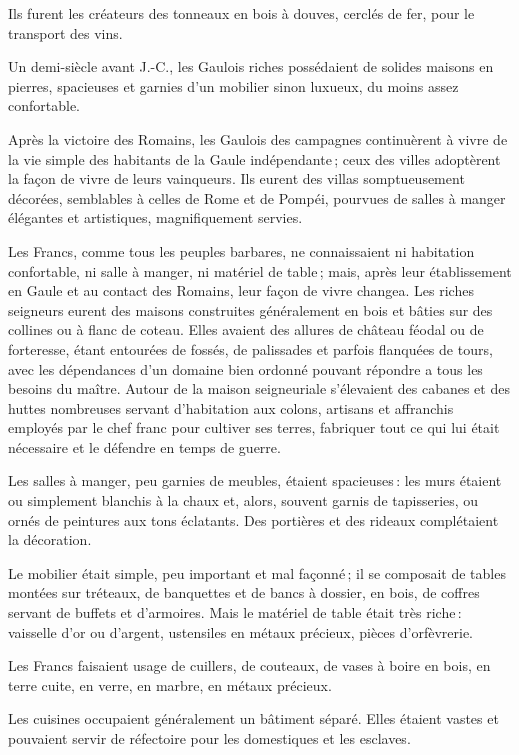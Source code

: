 Ils furent les créateurs des tonneaux en bois à douves, cerclés de fer, pour le
transport des vins.

Un demi-siècle avant J.-C., les Gaulois riches possédaient de solides maisons
en pierres, spacieuses et garnies d'un mobilier sinon luxueux, du moins assez
confortable.

Après la victoire des Romains, les Gaulois des campagnes continuèrent à vivre
de la vie simple des habitants de la Gaule indépendante ; ceux des villes
adoptèrent la façon de vivre de leurs vainqueurs. Ils eurent des villas
somptueusement décorées, semblables à celles de Rome et de Pompéi, pourvues de
salles à manger élégantes et artistiques, magnifiquement servies.

Les Francs, comme tous les peuples barbares, ne connaissaient ni habitation
confortable, ni salle à manger, ni matériel de table ; mais, après leur
établissement en Gaule et au contact des Romains, leur façon de vivre changea.
Les riches seigneurs eurent des maisons construites généralement en bois et
bâties sur des collines ou à flanc de coteau. Elles avaient des allures de
château féodal ou de forteresse, étant entourées de fossés, de palissades et
parfois flanquées de tours, avec les dépendances d'un domaine bien ordonné
pouvant répondre a tous les besoins du maître. Autour de la maison seigneuriale
s'élevaient des cabanes et des huttes nombreuses servant d'habitation aux
colons, artisans et affranchis employés par le chef franc pour cultiver ses
terres, fabriquer tout ce qui lui était nécessaire et le défendre en temps de
guerre.

Les salles à manger, peu garnies de meubles, étaient spacieuses : les murs
étaient ou simplement blanchis à la chaux et, alors, souvent garnis de
tapisseries, ou ornés de peintures aux tons éclatants. Des portières et des
rideaux complétaient la décoration.

Le mobilier était simple, peu important et mal façonné ; il se composait de
tables montées sur tréteaux, de banquettes et de bancs à dossier, en bois, de
coffres servant de buffets et d’armoires. Mais le matériel de table était très
riche : vaisselle d’or ou d'argent, ustensiles en métaux précieux, pièces
d'orfèvrerie.

Les Francs faisaient usage de cuillers, de couteaux, de vases à boire en bois,
en terre cuite, en verre, en marbre, en métaux précieux.

Les cuisines occupaient généralement un bâtiment séparé. Elles étaient vastes
et pouvaient servir de réfectoire pour les domestiques et les esclaves.

